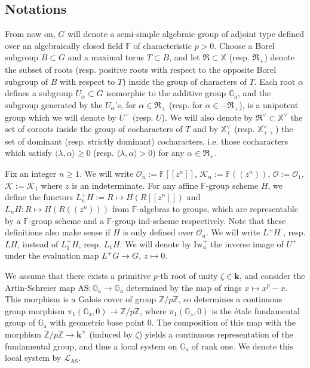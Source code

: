\documentclass[11pt]{amsart}
\theoremstyle{plain}
\theoremstyle{remark}
\numberwithin{equation}{section}
\begin{document}
	\subsection{Notations}\label{Notations} From now on, $G$ will denote a semi-simple algebraic group of adjoint type defined over an algebraically closed field $\mathbb{F}$ of characteristic $p>0$. Choose a Borel subgroup $B\subset G$ and a maximal torus $T\subset B$, and let $\mathfrak{R}\subset \mathbb{X}$ (resp. $\mathfrak{R}_+$) denote the subset of roots (resp. positive roots with respect to the opposite Borel subgroup of $B$ with respect to $T$) inside the group of characters of $T$. Each root $\alpha$ defines a subgroup $U_\alpha\subset G$ isomorphic to the additive group $\mathbb{G}_\mathrm{a}$, and the subgroup generated by the $U_\alpha$'s, for $\alpha\in\mathfrak{R}_+$ (resp. for $\alpha\in -\mathfrak{R}_+$), is a unipotent group which we will denote by $U^+$ (resp. $U$).  We will also denote by $\mathfrak{R}^\vee\subset\mathbb{X}^\vee$ the set of coroots inside the group of cocharacters of $T$ and by $\mathbb{X}^\vee_+$ (resp. $\mathbb{X}^\vee_{++}$) the set of dominant (resp. strictly dominant) cocharacters, i.e. those cocharacters which satisfy $\langle\lambda,\alpha\rangle\geq0$ (resp. $\langle\lambda,\alpha\rangle>0$) for any $\alpha\in \mathfrak{R}_+$. 
	
	Fix an integer $n\geq 1$. We will write $\mathcal{O}_n:=\mathbb{F}[[z^n]]$, $\mathcal{K}_n:=\mathbb{F}((z^n))$, $\mathcal{O}:=\mathcal{O}_1$, $\mathcal{K}:=\mathcal{K}_1$ where $z$ is an indeterminate. For any affine $\mathbb{F}$-group scheme $H$, we define the functors $L_n^+H:=R \mapsto H(R[[z^n]])$ and $L_nH:R \mapsto H(R((z^n)))$ from $\mathbb{F}$-algebras to groups, which are representable by a $\mathbb{F}$-group scheme and a $\mathbb{F}$-group ind-scheme respectively. Note that these definitions also make sense if $H$ is only defined over $\mathcal{O}_n$. We will write $L^+H$ , resp. $LH$, instead of $L_1^+H$, resp. $L_1H$. We will denote by $\mathrm{Iw}_u^+$ the inverse image of $U^+$ under the evaluation map $L^+G\to G,~z\mapsto 0$.
	
	We assume that there exists a primitive $p$-th root of unity $\zeta\in\mathbf{k}$, and consider the Artin-Schreier map $\mathrm{AS}:\mathbb{G}_\mathrm{a}\to \mathbb{G}_\mathrm{a}$ determined by the map of rings $x\mapsto x^p-x$. This morphism is a Galois cover of group $\mathbb{Z}/p\mathbb{Z}$, so determines a continuous group morphism $\pi_1(\mathbb{G}_\mathrm{a},0)\to \mathbb{Z}/p\mathbb{Z}$, where $\pi_1(\mathbb{G}_\mathrm{a},0)$ is the \'etale fundamental group of $\mathbb{G}_\mathrm{a}$ with geometric base point $0$. The composition of this map with the morphism $\mathbb{Z}/p\mathbb{Z}\to \mathbf{k}^\times$ (induced by $\zeta$) yields a continuous representation of the fundamental group, and thus a local system on $\mathbb{G}_\mathrm{a}$ of rank one. We denote this local system by $\mathcal{L}_{\mathrm{AS}}$.
	
\end{document}
